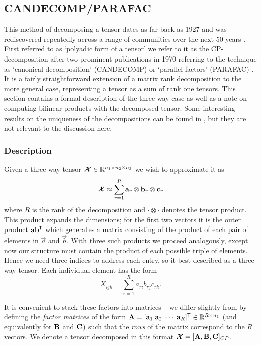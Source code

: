 {\subsection{CANDECOMP/PARAFAC}
This method of decomposing a tensor dates as far back as 1927 
\autocite{Hitchcock1927, Hitchcock1928} and was rediscovered repeatedly across a range of
communities over the next 50 years \autocite{Kolda2009}. First referred to as `polyadic
form of a tensor' we refer to it as the CP-decomposition after two prominent publications in
1970 referring to the technique as `canonical decomposition' (CANDECOMP) \autocite{Carroll1970}
 or `parallel factors' (PARAFAC) \autocite{Harshman1970}. 
 It is a fairly straightforward
extension of a matrix rank decomposition to the more general case, representing a tensor as
a sum of rank one tensors. This section contains a formal description of the three-way case
as well as a note on computing bilinear products with the decomposed tensor.
Some interesting results on the uniqueness of the decompositions can be found in \autocite{Kolda2009},
but they are not relevant to the discussion here.

\subsubsection{Description}
Given a three-way tensor \(\bm{\mathcal{X}} \in \mathbb{R}^{n_1 \times n_2 \times n_3}\) we wish to 
approximate it as
\begin{equation}\label{eq:cp-statement}
	\bm{\mathcal{X}} \approx \sum_{r=1}^{R} \mathbf{a}_r \otimes \mathbf{b}_r \otimes \mathbf{c}_r
\end{equation}
 where \(R\) is the rank of the decomposition and \(\cdot \otimes \cdot\) denotes the tensor
product. This product expands the dimensions; for the first two vectors it is the outer product
\(\mathbf{a}\mathbf{b}^{\mkern-1.5mu\mathsf{T}}\) which generates a matrix consisting of the product of each pair of
elements in \(\vec{a}\) and \(\vec{b}\). With three such products we proceed analogously, except
now our structure must contain the product of each possible triple of elements. Hence we need
three indices to address each entry, so it best described as a three-way tensor. Each individual
element has the form
\begin{equation}\label{eq:cp-element}
	X_{ijk} = \sum_{r=1}^R a_{ri}b_{rj}c_{rk}.
\end{equation}

It is convenient to stack these factors into matrices --
we differ slightly from \autocite{Kolda2009} by defining the \textit{factor matrices} of the 
form \(\mathbf{A} = [\mathbf{a}_1\;\mathbf{a}_2\;\cdots\;\mathbf{a}_R]^{\mathsf{T}} \in 
\mathbb{R}^{R\times n_1}\) (and equivalently for
\(\mathbf{B}\) and \(\mathbf{C}\)) such that the  \textit{rows} of the matrix correspond to the
\(R\) vectors. 
We denote a tensor decomposed in this format 
\(\bm{\mathcal{X}} = [\mathbf{A}, \mathbf{B}, \mathbf{C}]_{CP}\).

}
